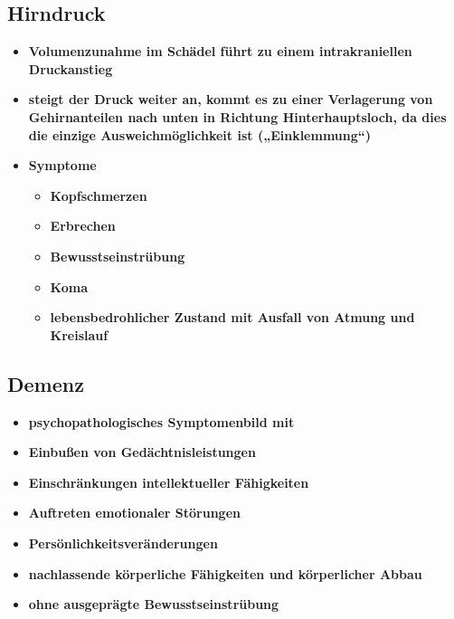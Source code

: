 \subsection{Hirndruck}
	\begin{itemize}
		\item \textbf{Volumenzunahme im Schädel führt zu einem intrakraniellen Druckanstieg}
		\item \textbf{steigt der Druck weiter an, kommt es zu einer Verlagerung von Gehirnanteilen nach unten in Richtung Hinterhauptsloch, da dies die einzige Ausweichmöglichkeit ist („Einklemmung“)}
		\item \textbf{Symptome}
			\begin{itemize}
				\item \textbf{Kopfschmerzen}
				\item \textbf{Erbrechen}
				\item \textbf{Bewusstseinstrübung}
				\item \textbf{Koma}
				\item \textbf{lebensbedrohlicher Zustand mit Ausfall von Atmung und Kreislauf}
			\end{itemize}
	\end{itemize}
	
\subsection{Demenz}
	\begin{itemize}
		\item \textbf{psychopathologisches Symptomenbild mit}
		\item \textbf{Einbußen von Gedächtnisleistungen}
		\item \textbf{Einschränkungen intellektueller Fähigkeiten}
		\item \textbf{Auftreten emotionaler Störungen}
		\item \textbf{Persönlichkeitsveränderungen}
		\item \textbf{nachlassende körperliche Fähigkeiten und körperlicher Abbau}
		\item \textbf{ohne ausgeprägte Bewusstseinstrübung}
	\end{itemize}
